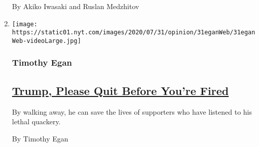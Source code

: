 \begin{enumerate}
  By Akiko Iwasaki and Ruslan Medzhitov
\item
  \texttt{[image: https://static01.nyt.com/images/2020/07/31/opinion/31eganWeb/31eganWeb-videoLarge.jpg]}

  \hypertarget{timothy-egan}{%
  \subsubsection{Timothy Egan}\label{timothy-egan}}

  \hypertarget{trump-please-quit-before-youre-fired}{%
  \subsection{\texorpdfstring{\href{/2020/07/31/opinion/trump-resign.html}{Trump,
  Please Quit Before You're
  Fired}}{Trump, Please Quit Before You're Fired}}\label{trump-please-quit-before-youre-fired}}

  By walking away, he can save the lives of supporters who have listened
  to his lethal quackery.

  By Timothy Egan
\end{enumerate}

